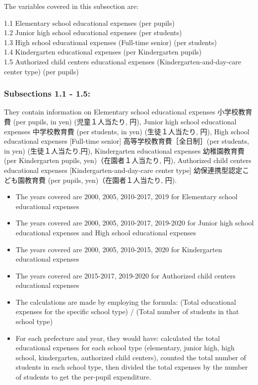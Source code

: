 \documentclass[
]{ltjarticle}
\begin{document}
The variables covered in this subsection are:

1.1 Elementary school educational expenses (per pupils)\\
1.2 Junior high school educational expenses (per students)\\
1.3 High school educational expenses (Full-time senior) (per students)\\
1.4 Kindergarten educational expenses (per Kindergarten pupils)\\
1.5 Authorized child centers educational expenses
(Kindergarten-and-day-care center type) (per pupils)

\hypertarget{subsections-1.1---1.5-1}{%
\subsubsection{Subsections 1.1 - 1.5:}\label{subsections-1.1---1.5-1}}

They contain information on Elementary school educational expenses
小学校教育費 (per pupils, in yen) (児童１人当たり, 円), Junior high
school educational expenses 中学校教育費 (per students, in yen)
(生徒１人当たり, 円), High school educational expenses {[}Full-time
senior{]} 高等学校教育費［全日制］(per students, in yen)
(生徒１人当たり,円), Kindergarten educational expenses 幼稚園教育費 (per
Kindergarten pupils, yen)（在園者１人当たり, 円), Authorized child
centers educational expenses {[}Kindergarten-and-day-care center type{]}
幼保連携型認定こども園教育費 (per pupils, yen)（在園者１人当たり, 円).

\begin{itemize}
\item
  The years covered are 2000, 2005, 2010-2017, 2019 for Elementary
  school educational expenses
\item
  The years covered are 2000, 2005, 2010-2017, 2019-2020 for Junior high
  school educational expenses and High school educational expenses
\item
  The years covered are 2000, 2005, 2010-2015, 2020 for Kindergarten
  educational expenses
\item
  The years covered are 2015-2017, 2019-2020 for Authorized child
  centers educational expenses
\item
  The calculations are made by employing the formula: (Total educational
  expenses for the specific school type) / (Total number of students in
  that school type)
\item
  For each prefecture and year, they would have: calculated the total
  educational expenses for each school type (elementary, junior high,
  high school, kindergarten, authorized child centers), counted the
  total number of students in each school type, then divided the total
  expenses by the number of students to get the per-pupil expenditure.
\end{itemize}
\end{document}
